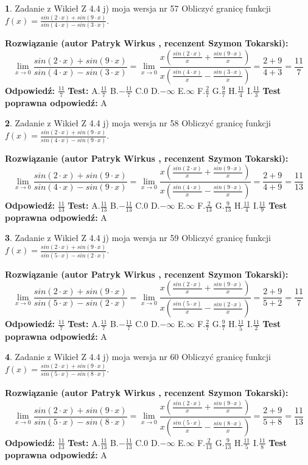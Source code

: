 \documentclass[12pt, a4paper]{article}
\theoremstyle{definition} %
\newtheorem{zad}{}
\newcommand{\zadStart}[1]{\begin{zad}#1\newline}
\newcommand{\zadStop}{\end{zad}}
\newcommand{\rozwStart}[2]{\noindent \textbf{Rozwiązanie (autor #1 , recenzent #2): }\newline}
\newcommand{\rozwStop}{\newline}
\newcommand{\odpStart}{\noindent \textbf{Odpowiedź:}\newline}
\newcommand{\odpStop}{\newline}
\newcommand{\testStart}{\noindent \textbf{Test:}\newline}
\newcommand{\testStop}{\newline}
\newcommand{\kluczStart}{\noindent \textbf{Test poprawna odpowiedź:}\newline}
\newcommand{\kluczStop}{\newline}
\begin{document}
\zadStart{Zadanie z Wikieł Z 4.4 j) moja wersja nr 57}
Obliczyć granicę funkcji $f(x)=\frac{sin(2\cdot x) +sin(9\cdot x)}{sin(4\cdot x) -sin(3\cdot x)}$.
\zadStop
\rozwStart{Patryk Wirkus}{Szymon Tokarski}
$$\lim\limits_{x\to 0}\frac{sin(2\cdot x) +sin(9\cdot x)}{sin(4\cdot x) -sin(3\cdot x)}=\lim\limits_{x\to 0}\frac{x(\frac{sin(2\cdot x)}{x}+\frac{sin(9\cdot x)}{x})}{x(\frac{sin(4\cdot x)}{x}-\frac{sin(3\cdot x)}{x})}=\frac{2+9}{4+3} = \frac{11}{7}$$
\rozwStop
\odpStart
$\frac{11}{7}$
\odpStop
\testStart
A.$\frac{11}{7}$
B.$-\frac{11}{7}$
C.$0$
D.$-\infty$
E.$\infty$
F.$\frac{2}{7}$
G.$\frac{9}{7}$
H.$\frac{11}{4}$
I.$\frac{11}{3}$
\testStop
\kluczStart
A
\kluczStop



\zadStart{Zadanie z Wikieł Z 4.4 j) moja wersja nr 58}
Obliczyć granicę funkcji $f(x)=\frac{sin(2\cdot x) +sin(9\cdot x)}{sin(4\cdot x) -sin(9\cdot x)}$.
\zadStop
\rozwStart{Patryk Wirkus}{Szymon Tokarski}
$$\lim\limits_{x\to 0}\frac{sin(2\cdot x) +sin(9\cdot x)}{sin(4\cdot x) -sin(9\cdot x)}=\lim\limits_{x\to 0}\frac{x(\frac{sin(2\cdot x)}{x}+\frac{sin(9\cdot x)}{x})}{x(\frac{sin(4\cdot x)}{x}-\frac{sin(9\cdot x)}{x})}=\frac{2+9}{4+9} = \frac{11}{13}$$
\rozwStop
\odpStart
$\frac{11}{13}$
\odpStop
\testStart
A.$\frac{11}{13}$
B.$-\frac{11}{13}$
C.$0$
D.$-\infty$
E.$\infty$
F.$\frac{2}{13}$
G.$\frac{9}{13}$
H.$\frac{11}{4}$
I.$\frac{11}{9}$
\testStop
\kluczStart
A
\kluczStop



\zadStart{Zadanie z Wikieł Z 4.4 j) moja wersja nr 59}
Obliczyć granicę funkcji $f(x)=\frac{sin(2\cdot x) +sin(9\cdot x)}{sin(5\cdot x) -sin(2\cdot x)}$.
\zadStop
\rozwStart{Patryk Wirkus}{Szymon Tokarski}
$$\lim\limits_{x\to 0}\frac{sin(2\cdot x) +sin(9\cdot x)}{sin(5\cdot x) -sin(2\cdot x)}=\lim\limits_{x\to 0}\frac{x(\frac{sin(2\cdot x)}{x}+\frac{sin(9\cdot x)}{x})}{x(\frac{sin(5\cdot x)}{x}-\frac{sin(2\cdot x)}{x})}=\frac{2+9}{5+2} = \frac{11}{7}$$
\rozwStop
\odpStart
$\frac{11}{7}$
\odpStop
\testStart
A.$\frac{11}{7}$
B.$-\frac{11}{7}$
C.$0$
D.$-\infty$
E.$\infty$
F.$\frac{2}{7}$
G.$\frac{9}{7}$
H.$\frac{11}{5}$
I.$\frac{11}{2}$
\testStop
\kluczStart
A
\kluczStop



\zadStart{Zadanie z Wikieł Z 4.4 j) moja wersja nr 60}
Obliczyć granicę funkcji $f(x)=\frac{sin(2\cdot x) +sin(9\cdot x)}{sin(5\cdot x) -sin(8\cdot x)}$.
\zadStop
\rozwStart{Patryk Wirkus}{Szymon Tokarski}
$$\lim\limits_{x\to 0}\frac{sin(2\cdot x) +sin(9\cdot x)}{sin(5\cdot x) -sin(8\cdot x)}=\lim\limits_{x\to 0}\frac{x(\frac{sin(2\cdot x)}{x}+\frac{sin(9\cdot x)}{x})}{x(\frac{sin(5\cdot x)}{x}-\frac{sin(8\cdot x)}{x})}=\frac{2+9}{5+8} = \frac{11}{13}$$
\rozwStop
\odpStart
$\frac{11}{13}$
\odpStop
\testStart
A.$\frac{11}{13}$
B.$-\frac{11}{13}$
C.$0$
D.$-\infty$
E.$\infty$
F.$\frac{2}{13}$
G.$\frac{9}{13}$
H.$\frac{11}{5}$
I.$\frac{11}{8}$
\testStop
\kluczStart
A
\kluczStop
\end{document}
